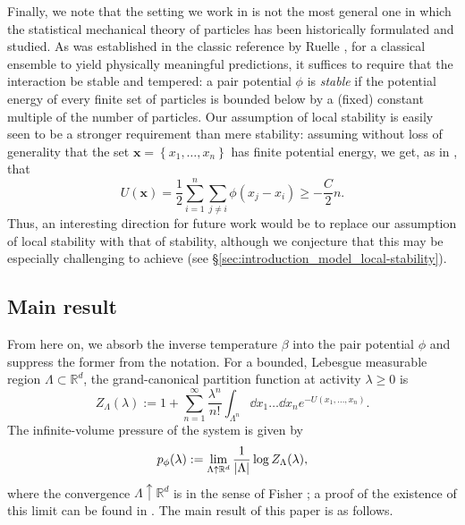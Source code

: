 \documentclass[11pt]{article}
\newcommand{\R}{\mathbb R}
\newcommand{\lsconst}{C}
\newcommand{\set}[1]{\left\{#1\right\}}
\numberwithin{equation}{section}
\theoremstyle{plain}
\theoremstyle{definition}
\theoremstyle{remark}
\begin{document}
Finally, we note that the setting we work in is not the most general one in which the statistical mechanical theory of particles has been historically formulated and studied.
As was established in the classic reference by Ruelle \cite{ruelle1969statistical}, for a classical ensemble to yield physically meaningful predictions, it suffices to require that the interaction be stable and tempered: a pair potential $\phi$ is \emph{stable} if the potential energy of every finite set of particles is bounded below by a (fixed) constant multiple of the number of particles.
Our assumption of local stability is easily seen to be a stronger requirement than mere stability: assuming without loss of generality that the set $\bm{x}=\set{x_{1},\dots,x_{n}}$ has finite potential energy, we get, as in \cite[\S3.2.5]{ruelle1969statistical}, that
\begin{equation}
\label{eqn:introduction_stability}
U(\bm{x})=\frac{1}{2}\sum_{i=1}^{n}\sum_{j\ne i}\phi(x_{j}-x_{i})\ge -\frac{\lsconst}{2}n.
\end{equation}
Thus, an interesting direction for future work would be to replace our assumption of local stability with that of stability, although we conjecture that this may be especially challenging to achieve (see \S\ref{sec:introduction_model_local-stability}).



\subsection{Main result}

From here on, we absorb the inverse temperature $\beta$ into the pair potential $\phi$ and suppress the former from the notation.
For a bounded, Lebesgue measurable region $\Lambda\subset\R^{d}$, the grand-canonical partition function at activity $\lambda\ge 0$ is 
\begin{equation}
\label{eqn:introduction_partition-function}
Z_{\Lambda}(\lambda):=1+\sum_{n=1}^{\infty}\frac{\lambda^{n}}{n!}\int_{\Lambda^{n}}\dd{x}_{1}\dots\dd{x}_{n}e^{-U(x_{1},\dots,x_{n})}.
\end{equation}
The infinite-volume pressure of the system is given by
\begin{equation}
p_{\phi}(\lambda):=\lim_{\Lambda\uparrow\R^{d}}\frac{1}{\abs{\Lambda}}\log Z_{\Lambda}(\lambda),
\end{equation}
where the convergence $\Lambda\uparrow\R^{d}$ is in the sense of Fisher \cite{fisher1964free}; a proof of the existence of this limit can be found in \cite[\S3]{ruelle1969statistical}.
The main result of this paper is as follows.
\end{document}
